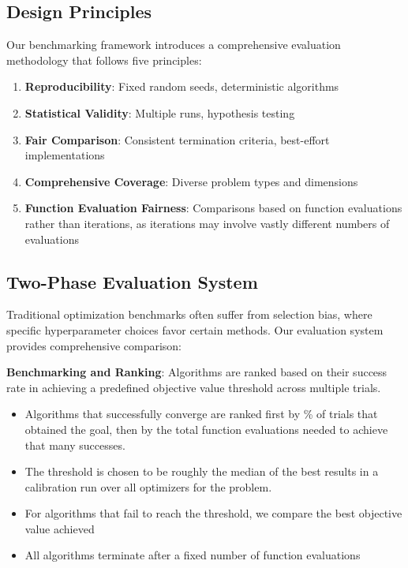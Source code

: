 \hypertarget{design-principles}{%
\subsection{Design Principles}\label{design-principles}}

Our benchmarking framework introduces a comprehensive evaluation methodology that follows five principles:

\begin{enumerate}
\def\labelenumi{\arabic{enumi}.}
\tightlist
\item
  \textbf{Reproducibility}: Fixed random seeds, deterministic algorithms
\item
  \textbf{Statistical Validity}: Multiple runs, hypothesis testing
\item
  \textbf{Fair Comparison}: Consistent termination criteria, best-effort implementations
\item
  \textbf{Comprehensive Coverage}: Diverse problem types and dimensions
\item
  \textbf{Function Evaluation Fairness}: Comparisons based on function evaluations rather than iterations, as iterations may involve vastly different numbers of evaluations
\end{enumerate}

\hypertarget{two-phase-evaluation-system}{%
\subsection{Two-Phase Evaluation System}\label{two-phase-evaluation-system}}

Traditional optimization benchmarks often suffer from selection bias, where specific hyperparameter choices favor certain methods. Our evaluation system provides comprehensive comparison:

\textbf{Benchmarking and Ranking}: Algorithms are ranked based on their success rate in achieving a predefined objective value threshold across multiple trials.

\begin{itemize}
\tightlist
\item
  Algorithms that successfully converge are ranked first by \% of trials that obtained the goal, then by the total function evaluations needed to achieve that many successes.
\item
  The threshold is chosen to be roughly the median of the best results in a calibration run over all optimizers for the problem.
\item
  For algorithms that fail to reach the threshold, we compare the best objective value achieved
\item
  All algorithms terminate after a fixed number of function evaluations
\end{itemize}

